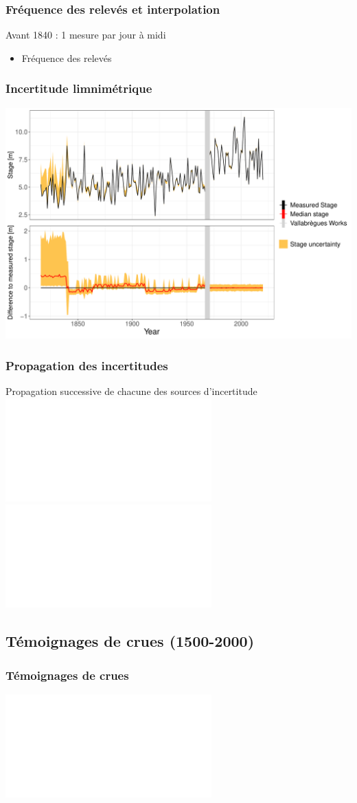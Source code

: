 \documentclass[compress,9pt]{beamer}
\begin{document}
	\begin{frame}
		\frametitle{Fréquence des relevés et interpolation}
		Avant 1840 : 1 mesure par jour à midi
		\vspace{15pt}
		\begin{itemize}
			\item<1> [$\vartriangleright$] Fréquence des relevés 
		\end{itemize}
	\end{frame}				
	
	\begin{frame}
		\frametitle{Incertitude limnimétrique}
		\centering
		\includegraphics[width = .8\textwidth]{./Figures/8-StageErrorAMAX_BOTH.pdf} 
	\end{frame}	
	
	\begin{frame}
		\frametitle{Propagation des incertitudes}
		\centering
		\vfill
		Propagation successive de chacune des sources d'incertitude\\
		\vfill
		\includegraphics<1>[width = .44\textwidth]{./Figures/SchemaProp3.pdf} 
		\includegraphics<2>[width = .85\textwidth]{./Figures/9-IcAndAMAX.pdf} 
	\end{frame}	
		
	\subsection{Témoignages de crues (1500-2000)}
	\begin{frame}
		\frametitle{Témoignages de crues}
		\centering
		\includegraphics<1>[width = .7\textwidth]{./Figures/HistoFloods2.pdf} 		
	\end{frame}		
	
\end{document}
